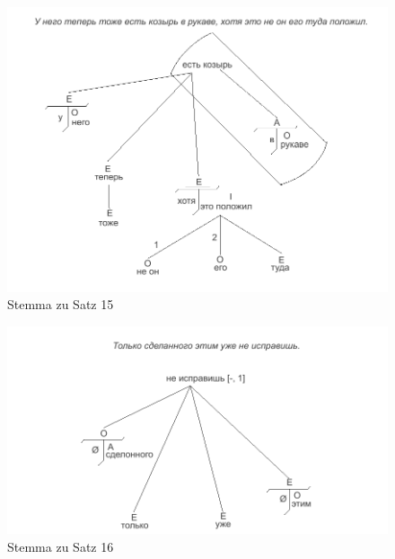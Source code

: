 \begin{figure}
    \begin{center}
        \includegraphics{anhang_a/stemma15}
        \caption{Stemma zu Satz 15}
        \label{fig:stemma15}
    \end{center}
\end{figure}

\begin{figure}
    \begin{center}
        \includegraphics{anhang_a/stemma16}
        \caption{Stemma zu Satz 16}
        \label{fig:stemma16}
    \end{center}
\end{figure}


